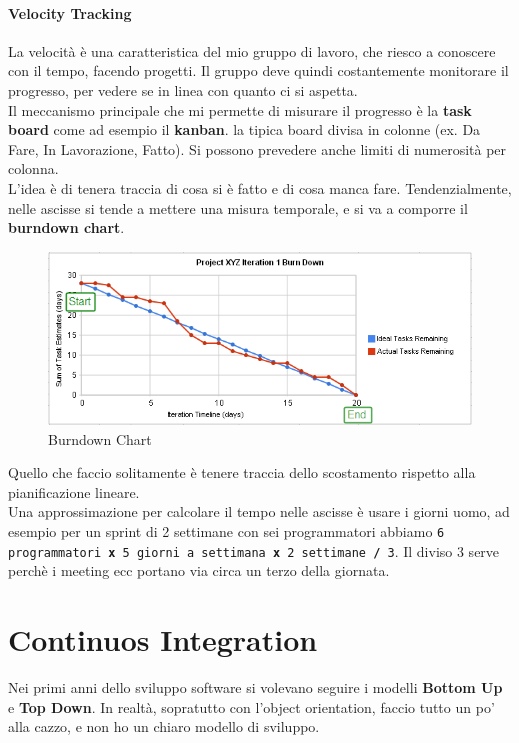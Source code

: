 \documentclass[a4paper,12pt]{article}
\begin{document}
\paragraph{Velocity Tracking}
La velocità è una caratteristica del mio gruppo di lavoro, che riesco a conoscere con il tempo, facendo progetti. Il gruppo deve quindi costantemente monitorare il progresso, per vedere se in linea con quanto ci si aspetta.\\
Il meccanismo principale che mi permette di misurare il progresso è la \textbf{task board} come ad esempio il \textbf{kanban}. \E la tipica board divisa in colonne (ex. Da Fare, In Lavorazione, Fatto). Si possono prevedere anche limiti di numerosità per colonna.\\
L'idea è di tenera traccia di cosa si è fatto e di cosa manca fare. Tendenzialmente, nelle ascisse si tende a mettere una misura temporale, e si va a comporre il \textbf{burndown chart}.
\begin{figure}[H]
	\centering
	 \includegraphics[width=\linewidth]{Immagini/burnDown}
	 \caption{Burndown Chart}
\end{figure}
Quello che faccio solitamente è tenere traccia dello scostamento rispetto alla pianificazione lineare.\\
Una approssimazione per calcolare il tempo nelle ascisse è usare i giorni uomo, ad esempio per un sprint di 2 settimane con sei programmatori abbiamo \texttt{6 programmatori \textbf{x} 5 giorni a settimana \textbf{x} 2 settimane \textbf{/} 3}. Il diviso 3 serve perchè i meeting ecc portano via circa un terzo della giornata.

\section{Continuos Integration}
Nei primi anni dello sviluppo software si volevano seguire i modelli \textbf{Bottom Up} e \textbf{Top Down}. In realtà, sopratutto con l'object orientation, faccio tutto un po' alla cazzo, e non ho un chiaro modello di sviluppo.
\end{document}
